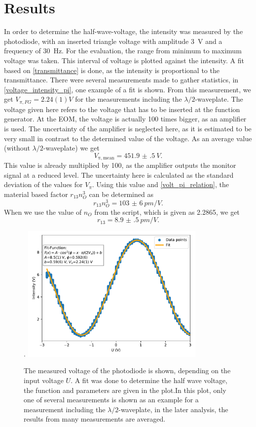 \section{Results}
In order to determine the half-wave-voltage, the intensity was measured by the photodiode, with an inserted triangle voltage with amplitude \SI{3}{V} and a frequency of \SI{30}{Hz}. For the evaluation, the range from minimum to maximum voltage was taken. This interval of voltage is plotted against the intensity. A fit based on \autoref{transmittance} is done, as the intensity is proportional to the transmittance. There were several measurements made to gather statistics, in \autoref{voltage_intensity_pi}, one example of a fit is shown. From this measurement, we get $V_{\pi,FG} = 2.24(1) \unit{V}$ for the measurements including the $\lambda/2$-waveplate. The voltage given here refers to the voltage that has to be inserted at the function generator. At the EOM, the voltage is actually 100 times bigger, as an amplifier is used. The uncertainty of the amplifier is neglected here, as it is estimated to be very small in contrast to the determined value of the voltage. As an average value (without $\lambda/2$-waveplate) we get 
$$V_{\mathrm{\pi, mean}}=\SI{451.9(5)}{V}.$$ 
This value is already multiplied by 100, as the amplifier outputs the monitor signal at a reduced level. The uncertainty here is calculated as the standard deviation of the values for $V_{\pi}$.  Using this value and \autoref{volt_pi_relation}, the material based factor $r_{13}n_O^3$ can be determined as 
$$r_{13}n_O^3=\SI{103(6)}{pm/V}.$$
When we use the value of $n_O$ from the script, which is given as 2.2865, we get $$r_{13}=\SI{8.9(5)}{pm/V}. $$

\begin{figure}[h].
	\centering
	\includegraphics[width=0.8\textwidth]{voltage_intensity_pi}
	\caption{The measured voltage of the photodiode is shown, depending on the input voltage $U$. A fit was done to determine the half wave voltage, the function and parameters are given in the plot.In this plot, only one of several measurements is shown as an example for a measurement including the $\lambda/2$-waveplate, in the later analysis, the results from many measurements are averaged.}
	\label{voltage_intensity_pi}
\end{figure}

